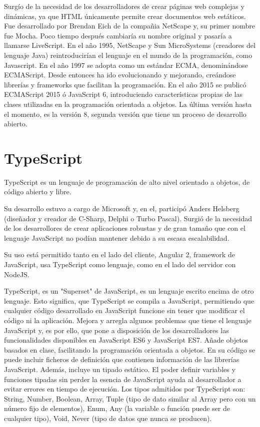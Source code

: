 \documentclass[a4paper, 12pt]{book}
\begin{document}
Surgío de la necesidad de los desarrolladores de crear páginas web complejas y dinámicas, ya que HTML únicamente permite crear documentos web estáticos. Fue desarrollado por Brendan Eich de la compañia NetScape y, su primer nombre fue Mocha. Poco tiempo después cambiaría su nombre original y pasaría a llamarse LiveScript. En el año 1995, NetScape y Sun MicroSystems (creadores del lenguaje Java) reintroducirían el lenguaje en el mundo de la programación, como Javascript. En el año 1997 se adopta como un estándar ECMA, denominándose ECMAScript. Desde entonces ha ido evolucionando  y mejorando, creándose librerías y frameworks que facilitan la programación. En el año 2015 se publicó ECMAScript 2015 ó JavaScript 6, introduciendo características propias de las clases utilizadas en la programación orientada a objetos. La última versión hasta el momento, es la versión 8, segunda versión que tiene un proceso de desarrollo abierto. 


\section{TypeScript} 
\label{sec:TypeScript}

TypeScript es un lenguaje de programación de alto nivel orientado a objetos, de código abierto y libre. 

Su desarrollo estuvo a cargo de Microsoft y, en el, participó Anders Helsberg (diseñador y creador de C-Sharp, Delphi o Turbo Pascal). Surgió de la necesidad de los desarrollores de crear aplicaciones robustas y de gran tamaño que con el lenguaje JavaScript no podían mantener debido a su escasa escalabilidad. 

Su uso está permitido tanto en el lado del cliente, Angular 2, framework de JavaScript, usa TypeScript como lenguaje, como en el lado del servidor con NodeJS. 

TypeScript, es un "Superset" de JavaScript, es un lenguaje escrito encima de otro lenguaje. Esto significa, que TypeScript se compila a JavaScript, permitiendo que cualquier código desarrollado en JavaScript funcione sin tener que modificar el código ni la aplicación. Mejora y arregla algunos problemas que tiene el lenguaje JavaScript y, es por ello, que pone a disposición de los desarrolladores las funcionalidades disponibles en JavaScript ES6 y JavaScript ES7. Añade objetos basados en clase, facilitando la programación orientada a objetos. En su código se puede incluir ficheros de definición que contienen información de las librerías JavaScript. Además, incluye un tipado estático. El poder definir variables y funciones tipadas sin perder la esencia de JavaScript ayuda al desarrollador a evitar errores en tiempo de ejecución. Los tipos admitidos por TypeScript son: String, Number, Boolean, Array, Tuple (tipo de dato similar al Array pero con un número fijo de elementos), Enum, Any (la variable o función puede ser de cualquier tipo), Void, Never (tipo de datos que nunca se producen). 
\end{document}
